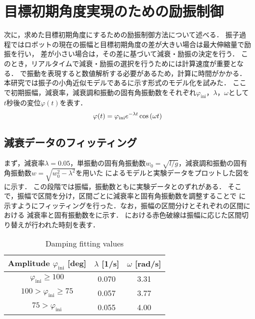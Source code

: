           \section{目標初期角度実現のための励振制御}
          次に，求めた目標初期角度にするための励振制御方法について述べる．
          振子過程ではロボットの現在の振幅と目標初期角度の差が大きい場合は最大伸縮量で励振を行い，
          差が小さい場合は，その差に基づいて減衰・励振の決定を行う．
          このとき，リアルタイムで減衰・励振の選択を行うためには計算速度が重要となる．
          で振動を表現すると数値解析する必要があるため，計算に時間がかかる．
          本研究では振子の小角近似モデルであるに示す形式のモデル化を試みた．
          ここで初期振幅，減衰率，減衰調和振動の固有角振動数をそれぞれ$\varphi_{\mathrm{ini}}$，$\lambda$，$\omega$として
          $t$秒後の変位$\varphi(t)$を表す．
          \begin{eqnarray}
            \equlabel{Approximation Model}
            \varphi(t)=\varphi_{\mathrm{ini}}e^{-\lambda t}\cos{(\omega t)}
          \end{eqnarray}
          \subsection{減衰データのフィッティング}
            まず，減衰率$\lambda=0.05$，単振動の固有角振動数$w_0=\sqrt{l/g}$，減衰調和振動の固有角振動数$w=\sqrt{w_{0}^2-\lambda^2}$を用いた
            によるモデルと実験データをプロットした図を\figref{}に示す．
            この段階では振幅，振動数ともに実験データとのずれがある．
            そこで，振幅で区間を分け，区間ごとに減衰率と固有角振動数を調整することで
            \figref{}に示すようにフィッティングを行った．なお，振幅の区間分けとそれぞれの区間における
            減衰率と固有振動数をに示す．
            \figref{}における赤色破線は振幅に応じた区間切り替えが行われた時刻を表す．
            \begin{table}[tb]
              \begin{center}
                \caption{Damping fitting values}
                \vspace{2mm}
                \begin{tabular}{c|c|c}
                  \hline
                  Amplitude $\varphi_{\mathrm{ini}}$ [deg] & $\lambda$ [1/s] & $\omega$ [rad/s]\\
                  \hline
                  $\varphi_{\mathrm{ini}}\ge100$ & 0.070 & 3.31 \\
                  $100>\varphi_{\mathrm{ini}}\ge75$ & 0.057 & 3.77 \\
                  $75>\varphi_{\mathrm{ini}}$ & 0.055 & 4.00 \\                   
                  \hline
                \end{tabular}
              \end{center}
            \end{table}

